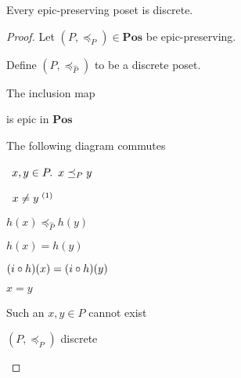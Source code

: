 \begin{prop}
  Every epic-preserving poset is discrete.

  \begin{proof}
    Let $(P,\preceq_P)\in\mathbf{Pos}$ be epic-preserving.
    \begin{itemize}
      \step
        Define $(P, \preceq_{\widehat{P}})$ to be a discrete poset.

      \step[\imps]
        The inclusion map
        is epic in $\mathbf{Pos}$

      \step[\imps] The following diagram commutes
        \begin{center}
        \end{center}

      \step
        \begin{itemize}
          \subp{\star}
            \Let~$x,y\in P\ldotp~x\preceq_P y$
            \marginnote{\Hyp}

          \step
            \Ass~$x\neq y^{\text~(1)}$
            \marginnote{\Hyp}

          \step[\imps] $h(x) \preceq_{\widehat{P}} h(y)$

          \step[\imps]
            $h(x) = h(y)$

          \step[\imps]
            $(i\circ h)(x) = (i\circ h)(y)$

          \step[\imps]
            $x = y$
        \end{itemize}
        \step[\contras] Such an $x,y\in P$ cannot exist

        \step[\imps] $(P, \preceq_P)$ discrete\qedhere
    \end{itemize}
  \end{proof}

\end{prop}

